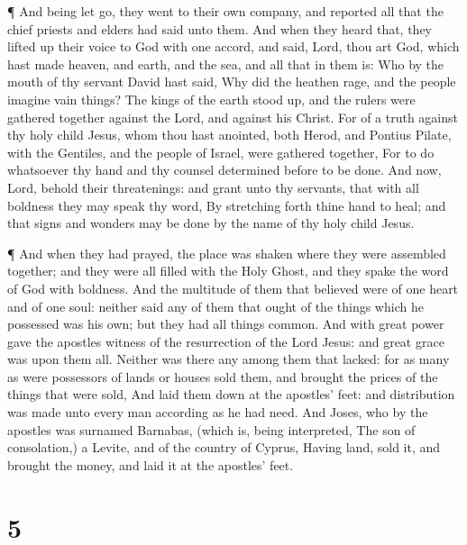  ¶ And being let go, they went to their own company, and
reported all that the chief priests and elders had said unto them.
 And when they heard that, they lifted up their voice to
God with one accord, and said, Lord, thou art God, which hast made
heaven, and earth, and the sea, and all that in them is: 
Who by the mouth of thy servant David hast said, Why did the heathen
rage, and the people imagine vain things?  The kings of the
earth stood up, and the rulers were gathered together against the Lord,
and against his Christ.  For of a truth against thy holy
child Jesus, whom thou hast anointed, both Herod, and Pontius Pilate,
with the Gentiles, and the people of Israel, were gathered together,
 For to do whatsoever thy hand and thy counsel determined
before to be done.  And now, Lord, behold their
threatenings: and grant unto thy servants, that with all boldness they
may speak thy word,  By stretching forth thine hand to
heal; and that signs and wonders may be done by the name of thy holy
child Jesus.

 ¶ And when they had prayed, the place was shaken where
they were assembled together; and they were all filled with the Holy
Ghost, and they spake the word of God with boldness.  And
the multitude of them that believed were of one heart and of one soul:
neither said any of them that ought of the things which he possessed was
his own; but they had all things common.  And with great
power gave the apostles witness of the resurrection of the Lord Jesus:
and great grace was upon them all.  Neither was there any
among them that lacked: for as many as were possessors of lands or
houses sold them, and brought the prices of the things that were sold,
 And laid them down at the apostles' feet: and distribution
was made unto every man according as he had need.  And
Joses, who by the apostles was surnamed Barnabas, (which is, being
interpreted, The son of consolation,) a Levite, and of the country of
Cyprus,  Having land, sold it, and brought the money, and
laid it at the apostles' feet.

\hypertarget{section-4}{%
\section{5}\label{section-4}}


